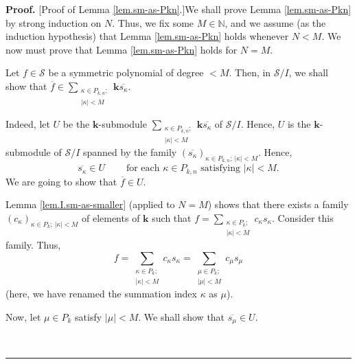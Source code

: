 \documentclass[numbers=enddot,12pt,final,onecolumn,notitlepage]{scrartcl}%
\theoremstyle{definition}
\newenvironment{proof}[1][Proof]{\noindent\textbf{#1.} }{\ \rule{0.5em}{0.5em}}
\let\sumnonlimits\sum
\renewcommand{\sum}{\sumnonlimits\limits}
\begin{document}
\begin{proof}
[Proof of Lemma \ref{lem.sm-as-Pkn}.]We shall prove Lemma \ref{lem.sm-as-Pkn}
by strong induction on $N$. Thus, we fix some $M\in\mathbb{N}$, and we assume
(as the induction hypothesis) that Lemma \ref{lem.sm-as-Pkn} holds whenever
$N<M$. We now must prove that Lemma \ref{lem.sm-as-Pkn} holds for $N=M$.

Let $f\in\mathcal{S}$ be a symmetric polynomial of degree $<M$. Then, in
$\mathcal{S}/I$, we shall show that $\overline{f}\in\sum_{\substack{\kappa\in
P_{k,n};\\\left\vert \kappa\right\vert <M}}\mathbf{k}\overline{s_{\kappa}}$.

Indeed, let $U$ be the $\mathbf{k}$-submodule $\sum_{\substack{\kappa\in
P_{k,n};\\\left\vert \kappa\right\vert <M}}\mathbf{k}\overline{s_{\kappa}}$ of
$\mathcal{S}/I$. Hence, $U$ is the $\mathbf{k}$-submodule of $\mathcal{S}/I$
spanned by the family $\left(  \overline{s_{\kappa}}\right)  _{\kappa\in
P_{k,n};\ \left\vert \kappa\right\vert <M}$. Hence,%
\begin{equation}
\overline{s_{\kappa}}\in U\ \ \ \ \ \ \ \ \ \ \text{for each }\kappa\in
P_{k,n}\text{ satisfying }\left\vert \kappa\right\vert <M.
\label{pf.lem.sm-as-Pkn.inU}%
\end{equation}
We are going to show that $\overline{f}\in U$.

Lemma \ref{lem.I.sm-as-smaller} (applied to $N=M$) shows that there exists a
family $\left(  c_{\kappa}\right)  _{\kappa\in P_{k};\ \left\vert
\kappa\right\vert <M}$ of elements of $\mathbf{k}$ such that $f=\sum
_{\substack{\kappa\in P_{k};\\\left\vert \kappa\right\vert <M}}c_{\kappa
}s_{\kappa}$. Consider this family. Thus,%
\begin{equation}
f=\sum_{\substack{\kappa\in P_{k};\\\left\vert \kappa\right\vert <M}%
}c_{\kappa}s_{\kappa}=\sum_{\substack{\mu\in P_{k};\\\left\vert \mu\right\vert
<M}}c_{\mu}s_{\mu} \label{pf.lem.sm-as-Pkn.f=1}%
\end{equation}
(here, we have renamed the summation index $\kappa$ as $\mu$).

Now, let $\mu\in P_{k}$ satisfy $\left\vert \mu\right\vert <M$. We shall show
that $\overline{s_{\mu}}\in U$.


\end{proof}
\end{document}
